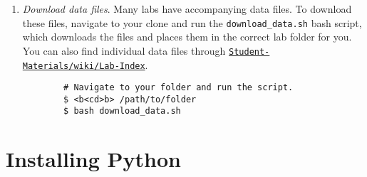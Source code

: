 \begin{enumerate}
    \item \emph{Download data files}.
    \label{step:download-data}
    Many labs have accompanying data files.
    To download these files, navigate to your clone and run the \texttt{download\_data.sh} bash script, which downloads the files and places them in the correct lab folder for you.
    You can also find individual data files through \href{https://github.com/Foundations-of-Applied-Mathematics/Student-Materials/wiki/Lab-Index}{\texttt{Student-Materials/wiki/Lab-Index}}.
    
    \begin{lstlisting}
        # Navigate to your folder and run the script.
        $ <b<cd>b> /path/to/folder
        $ bash download_data.sh
    \end{lstlisting}
\end{enumerate}
\fi
\section*{Installing Python}

